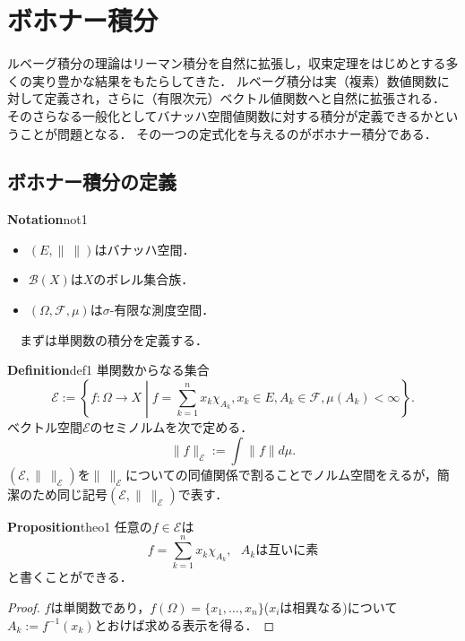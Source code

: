 \documentclass[dvipdfmx,autodetect-engine]{jbook}
\newcommand{\relmiddle}[1]{\mathrel{}\middle#1\mathrel{}}
\begin{document}
\pagestyle{fancy}
  \fancyhead{}
  \fancyhead[RO,RE]{\rightmark}
  \fancyhead[LE,LO]{\leftmark}
  \cfoot{\thepage}
  \renewcommand{\chaptermark}[1]{\markboth{第\ \thechapter\ 章~#1}{}}
  \renewcommand{\sectionmark}[1]{\markright{\thesection #1}{}}

 \chapter{ ボホナー積分}
 ルベーグ積分の理論はリーマン積分を自然に拡張し，収束定理をはじめとする多くの実り豊かな結果をもたらしてきた．
 ルベーグ積分は実（複素）数値関数に対して定義され，さらに（有限次元）ベクトル値関数へと自然に拡張される．
 そのさらなる一般化としてバナッハ空間値関数に対する積分が定義できるかということが問題となる．
 その一つの定式化を与えるのがボホナー積分である．
\section{ボホナー積分の定義}
  \begin{mydef}{\textbf{Notation}}{not1}
    \begin{itemize}
      \item $(E,\|\ \|)$はバナッハ空間．
      \item $\mathcal{B}(X)$は$X$のボレル集合族．
      \item $(\Omega , \mathcal{F},\mu)$は$\sigma$-有限な測度空間．
    \end{itemize}
  \end{mydef}
　まずは単関数の積分を定義する．
  \begin{mydef}{\textbf{Definition}}{def1}
    単関数からなる集合
    \begin{equation*}
      \mathcal{E}:=\left\{ f:\Omega \to X \relmiddle| f=\sum_{k=1}^{n}x_{k}\chi_{A_k},x_k \in E , A_k \in \mathcal{F} , \mu(A_k)< \infty  \right\}.
    \end{equation*}
    ベクトル空間$\mathcal{E}$のセミノルムを次で定める．
    \begin{equation*}
      \|f\|_{\mathcal{E}}:=\int \|f\|d\mu.
    \end{equation*}
    $(\mathcal{E},\|\ \|_{\mathcal{E}})$を$\|\ \|_{\mathcal{E}}$についての同値関係で割ることでノルム空間をえるが，簡潔のため同じ記号$(\mathcal{E},\|\ \|_{\mathcal{E}})$で表す．
  \end{mydef}
  \begin{mytheo}{\textbf{Proposition}}{theo1}
    任意の$f\in \mathcal{E}$は
    \begin{equation*}
      f=\sum_{k=1}^{n}x_k \chi_{A_k},\ \ \ A_{k}は互いに素
    \end{equation*}
    と書くことができる．
  \end{mytheo}
  \begin{proof}
    $f$は単関数であり，$f(\Omega)=\{x_1,\ldots,x_n\}$($x_i$は相異なる)について$A_k:=f^{-1}(x_k)$とおけば求める表示を得る．
  \end{proof}
\end{document}
